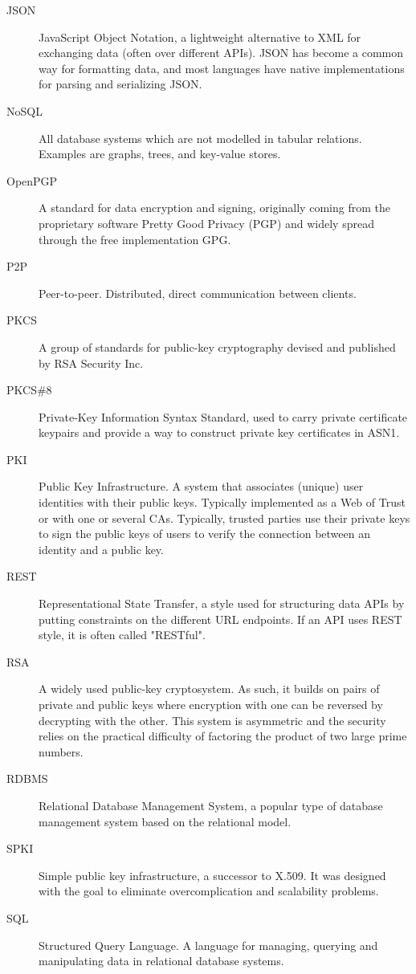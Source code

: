 \begin{description}
  \item[JSON] JavaScript Object Notation, a lightweight alternative to XML for exchanging data (often over different APIs). JSON has become a common way for formatting data, and most languages have native implementations for parsing and serializing JSON.
  \item[NoSQL] All database systems which are not modelled in tabular relations. Examples are graphs, trees, and key-value stores.
  \item[OpenPGP] A standard for data encryption and signing, originally coming from the proprietary software Pretty Good Privacy (PGP) and widely spread through the free implementation GPG.
  \item[P2P] Peer-to-peer. Distributed, direct communication between clients.
  \item[PKCS] A group of standards for public-key cryptography devised and published by RSA Security Inc.
  \item[PKCS\#8] Private-Key Information Syntax Standard, used to carry private certificate keypairs and provide a way to construct private key certificates in ASN1.
  \item[PKI] Public Key Infrastructure. A system that associates (unique) user identities with their public keys. Typically implemented as a Web of Trust or with one or several CAs. Typically, trusted parties use their private keys to sign the public keys of users to verify the connection between an identity and a public key.
  \item[REST] Representational State Transfer, a style used for structuring data APIs by putting constraints on the different URL endpoints. If an API uses REST style, it is often called "RESTful".
  \item[RSA] A widely used public-key cryptosystem. As such, it builds on pairs of private and public keys where encryption with one can be reversed by decrypting with the other. This system is asymmetric and the security relies on the practical difficulty of factoring the product of two large prime numbers.
  \item[RDBMS] Relational Database Management System, a popular type of database management system based on the relational model.
  \item[SPKI] Simple public key infrastructure, a successor to X.509. It was designed with the goal to eliminate overcomplication and scalability problems.
  \item[SQL] Structured Query Language. A language for managing, querying and manipulating data in relational database systems.

\end{description}
